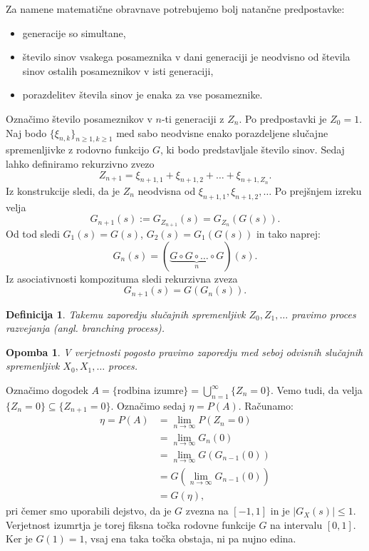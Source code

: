 \documentclass[10pt, a4paper]{article}
\newtheorem{defi}[izr]{Definicija}
\newenvironment{noticeB}{%
  \tcolorbox[%
  notitle,
  empty,
  enhanced,  %
  breakable,
  coltext=black,
  colback=white, 
  fontupper=\rmfamily,
  parbox=false,
  noparskip,
  sharp corners,
  boxrule=-1pt,  %
  frame hidden,
  left=7pt,  %
  right=7pt,
  top=5pt,
  bottom=5pt,
  before skip=2.5ex plus 2pt,
  after skip=2.5ex plus 2pt,
  borderline west = {1.5pt}{-0.1pt}{blue!30!black}, %
  overlay unbroken and last={%
    \draw[color=black, line width=1.25pt]
    ($(frame.south west)+(1.pt, -0.1pt)$) -- ++(2em, 0);
  }
  ]}
{\endtcolorbox}
\newenvironment{definicija}{\begin{defi}\begin{noticeB}}{%
    \end{noticeB}\end{defi}}
\newtheorem*{opomba}{Opomba}
\begin{document}
Za namene matematične obravnave potrebujemo bolj natančne predpostavke:
\begin{itemize}
  \item generacije so simultane,
  \item število sinov vsakega posameznika v dani generaciji je neodvisno od števila sinov ostalih posameznikov v isti generaciji,
  \item porazdelitev števila sinov je enaka za vse posameznike.
\end{itemize}
Označimo število posameznikov v $n$-ti generaciji z $Z_n$.
Po predpostavki je $Z_0 = 1$.
Naj bodo $\{\xi_{n, k}\}_{n \geq 1, k \geq 1}$ med sabo neodvisne enako porazdeljene slučajne spremenljivke z rodovno funkcijo $G$,
ki bodo predstavljale število sinov. Sedaj lahko definiramo rekurzivno zvezo 
$$Z_{n + 1} = \xi_{n + 1, 1} + \xi_{n + 1, 2} + \dots + \xi_{n + 1, Z_n}.$$
Iz konstrukcije sledi, da je $Z_n$ neodvisna od $\xi_{n + 1, 1}, \xi_{n + 1, 2}, \dots$
Po prejšnjem izreku velja 
$$G_{n+1} (s) := G_{Z_{n + 1}} (s) = G_{Z_n} (G(s)).$$
Od tod sledi $G_1 (s) = G(s)$, $G_2 (s) = G_1 (G(s))$ in tako naprej:
$$G_n(s) = (\underbrace{G \circ G \circ \dots \circ G}_{n})(s).$$
Iz asociativnosti kompozituma sledi rekurzivna zveza
$$G_{n + 1} (s) = G(G_n (s)).$$

\begin{definicija}
  Takemu zaporedju slučajnih spremenljivk $Z_0, Z_1, \dots$ pravimo proces razvejanja (angl. \emph{branching process}).
\end{definicija}

\begin{opomba}
  V verjetnosti pogosto pravimo zaporedju med seboj odvisnih slučajnih spremenljivk 
  $X_0, X_1, \dots$ proces.
\end{opomba}

Označimo dogodek $A = \{\text{rodbina izumre}\} = \bigcup_{n = 1} ^\infty \{Z_n = 0\}$.
Vemo tudi, da velja $\{Z_n = 0\} \subseteq \{Z_{n + 1} = 0\}$.
Označimo sedaj $\eta = P(A)$. Računamo:
\begin{align*}
  \eta = P(A) &= \lim_{n \to \infty} P(Z_n = 0)\\
  &= \lim_{n \to \infty} G_{n} (0)\\
  &= \lim_{n \to \infty} G(G_{n - 1} (0))\\
  &= G(\lim_{n \to \infty} G_{n - 1} (0))\\
  &= G(\eta),
\end{align*}
pri čemer smo uporabili dejstvo, da je $G$ zvezna na $[-1, 1]$ in je $|G_X (s)| \leq 1$.
Verjetnost izumrtja je torej fiksna točka rodovne funkcije $G$ na intervalu $[0, 1]$.
Ker je $G(1) = 1$, vsaj ena taka točka obstaja, ni pa nujno edina.
\end{document}
